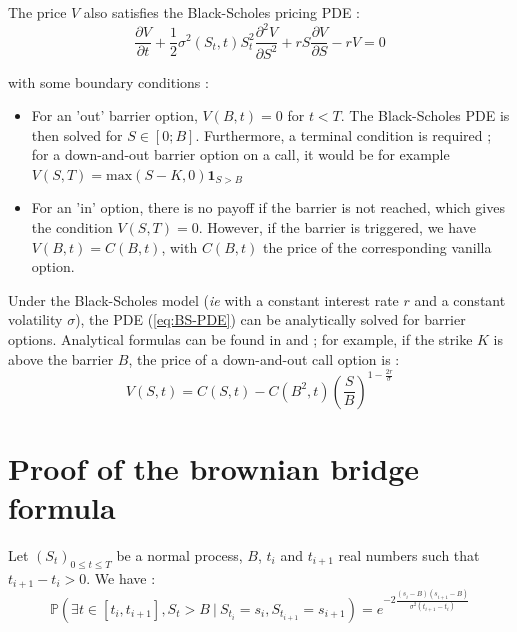 \documentclass[a4paper,11pt,english]{book}
\begin{document}
The price $V$ also satisfies the Black-Scholes pricing PDE :
\begin{equation}
    \frac{\partial V}{\partial t} + \frac{1}{2}\sigma^2(S_t,t)S_t^2 \frac{\partial^2 V}{\partial S^2} + rS\frac{\partial V}{\partial S}-rV=0
    \label{eq:BS-PDE}
\end{equation}


with some boundary conditions :
\begin{itemize}
    \item For an 'out' barrier option, $V(B,t)=0$ for $t<T$. The Black-Scholes PDE is then solved for $S\in[0;B]$. Furthermore, a terminal condition is required ; for a down-and-out barrier option on a call, it would be for example $V(S,T)=\text{max}(S-K,0)\mathbf{1}_{S>B}$
    \item For an 'in' option, there is no payoff if the barrier is not reached, which gives the condition $V(S,T)=0$. However, if the barrier is triggered, we have $V(B,t)=C(B,t)$, with $C(B,t)$ the price of the corresponding vanilla option.
\end{itemize}

Under the Black-Scholes model (\textit{ie} with a constant interest rate $r$ and a constant volatility $\sigma$), the PDE (\ref{eq:BS-PDE}) can be analytically solved for barrier options. Analytical formulas can be found in \cite{hull2016options} and \cite{wilmott2007paul} ; for example, if the strike $K$ is above the barrier $B$, the price of a down-and-out call option is :
$$V(S,t)=C(S,t)-C(B^2,t)(\frac{S}{B})^{1-\frac{2r}{\sigma}}$$

\section{Proof of the brownian bridge formula}
\label{appendix:brownian-bridge}
Let $(S_t)_{0 \leq t \leq T}$ be a normal process, $B$, $t_i$ and $t_{i+1}$ real numbers such that $t_{i+1}-t_i>0$. We have : 
\begin{equation}
    \mathbb{P}(\exists t \in [t_i,t_{i+1}],S_t>B~|~S_{t_i}=s_i,S_{t_{i+1}}=s_{i+1}) = e^{-2 \frac{(s_i-B)(s_{i+1}-B)}{\sigma^2(t_{i+1}-t_i)}}
    \label{eq:brownian-bridge}
\end{equation}
    
\end{document}
